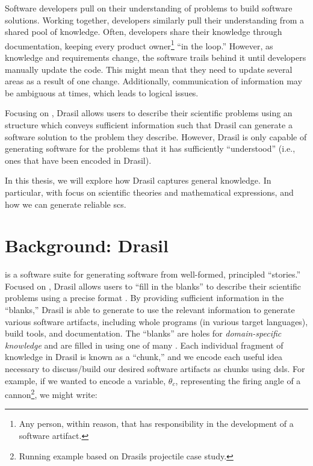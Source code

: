 Software developers pull on their understanding of problems to build software
solutions. Working together, developers similarly pull their understanding from
a shared pool of knowledge. Often, developers share their knowledge through
documentation, keeping every product owner\footnote{Any person, within reason,
      that has responsibility in the development of a software artifact.} ``in the
loop.'' However, as knowledge and requirements change, the software trails
behind it until developers manually update the code. This might mean that they
need to update several areas as a result of one change. Additionally,
communication of information may be ambiguous at times, which leads to logical
issues.

Focusing on , Drasil allows users to describe their scientific problems
using an  structure which conveys sufficient information such that
Drasil can generate a software solution to the problem they describe. However,
Drasil is only capable of generating software for the problems that it has
sufficiently ``understood'' (i.e., ones that have been encoded in Drasil).

In this thesis, we will explore how Drasil captures general knowledge. In
particular, with focus on scientific theories and mathematical expressions, and
how we can generate reliable \acs{scs}.

\section{Background: Drasil}
\label{chap:introduction:sec:background}

 is a software suite
for generating software from well-formed, principled ``stories.'' Focused on
, Drasil allows users to ``fill in the blanks'' to describe their
scientific problems using a precise  format \cite{SmithAndLai2005}. By
providing sufficient information in the ``blanks,'' Drasil is able to generate
to use the relevant information to generate various software artifacts,
including whole programs (in various target languages), build tools, and
documentation. The ``blanks'' are holes for \textit{domain-specific knowledge}
and are filled in using one of many . Each individual fragment of
knowledge in Drasil is known as a ``chunk,'' and we encode each useful idea
necessary to discuss/build our desired software artifacts as chunks using
\acsp{dsl}. For example, if we wanted to encode a variable, \(\theta{}_{c}\),
representing the firing angle of a cannon\footnote{Running example based on
      Drasils \acs{projectile} case study.}, we might write:

